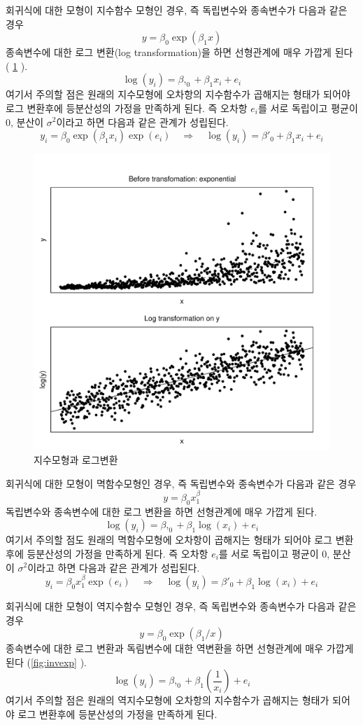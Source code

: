 \documentclass[
]{book}
\theoremstyle{definition}
\theoremstyle{definition}
\theoremstyle{definition}
\theoremstyle{remark}
\begin{document}
회귀식에 대한 모형이 지수함수 모형인 경우, 즉 독립변수와 종속변수가 다음과 같은 경우
\[ y = \beta_0 \exp (\beta_1 x) \]
종속변수에 대한 로그 변환(log transformation)을 하면 선형관계에 매우 가깝게 된다 ( \ref{fig:logtrans} ).
\[ \log(y_i) = \beta,_0 + \beta_1 x_i + e_i \]
여기서 주의할 점은 원래의 지수모형에 오차항의 지수함수가 곱해지는 형태가 되어야 로그 변환후에 등분산성의 가정을 만족하게 된다. 즉
오차항 \(e_i\)를 서로 독립이고 평균이 0, 분산이 \(\sigma^2\)이라고 하면 다음과 같은 관계가 성립된다.
\[ y_i = \beta_0 \exp (\beta_1 x_i)\exp(e_i) \quad \Rightarrow \quad \log(y_i) = \beta'_0 + \beta_1 x_i + e_i \]

\begin{figure}
\includegraphics[width=0.8\linewidth]{logtrans} \caption{지수모형과 로그변환}\label{fig:logtrans}
\end{figure}

회귀식에 대한 모형이 멱함수모형인 경우, 즉 독립변수와 종속변수가 다음과 같은 경우
\[ y = \beta_0  x^\beta_1 \]
독립변수와 종속변수에 대한 로그 변환을 하면 선형관계에 매우 가깝게 된다.
\[ \log(y_i) = \beta,_0 + \beta_1 \log(x_i) + e_i \]
여기서 주의할 점도 원래의 멱함수모형에 오차항이 곱해지는 형태가 되어야 로그 변환후에 등분산성의 가정을 만족하게 된다. 즉
오차항 \(e_i\)를 서로 독립이고 평균이 0, 분산이 \(\sigma^2\)이라고 하면 다음과 같은 관계가 성립된다.
\[ y_i = \beta_0  x^\beta_1 \exp(e_i) \quad \Rightarrow \quad \log(y_i) = \beta'_0 + \beta_1 \log(x_i) + e_i \]

회귀식에 대한 모형이 역지수함수 모형인 경우, 즉 독립변수와 종속변수가 다음과 같은 경우
\[ y = \beta_0 \exp (\beta_1/ x) \]
종속변수에 대한 로그 변환과 독림변수에 대한 역변환을 하면 선형관계에 매우 가깝게 된다 (\ref{fig:invexp} ).
\[ \log(y_i) = \beta,_0 + \beta_1 \left ( \frac{1}{x_i} \right ) + e_i \]
여기서 주의할 점은 원래의 역지수모형에 오차항의 지수함수가 곱해지는 형태가 되어야 로그 변환후에 등분산성의 가정을 만족하게 된다.
\end{document}
